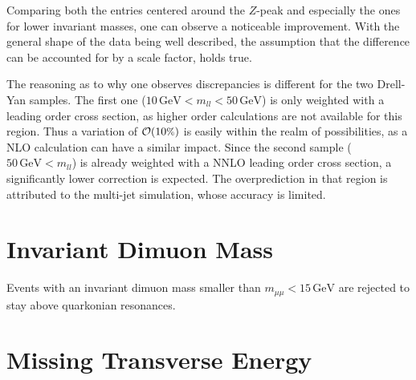 \noindent Comparing both the entries centered around the $Z$-peak and especially the ones for lower invariant masses, one can observe a noticeable improvement. With the general shape of the data being well described, the assumption that the difference can be accounted for by a scale factor, holds true. 

The reasoning as to why one observes discrepancies is different for the two Drell-Yan samples. The first one ($10\,\text{GeV} < m_{ll} < 50\,\text{GeV}$) is only weighted with a leading order cross section, as higher order calculations are not available for this region. Thus a variation of $\mathcal{O}(10\pct)$ is easily within the realm of possibilities, as a NLO calculation can have a similar impact. Since the second sample ($50\,\text{GeV} < m_{ll}$) is already weighted with a NNLO leading order cross section, a significantly lower correction is expected. The overprediction in that region is attributed to the multi-jet simulation, whose accuracy is limited.


\section{Invariant Dimuon Mass}
\label{sec:m_mumu}

Events with an invariant dimuon mass smaller than $m_{\mu\mu} < 15\,\text{GeV}$ are rejected to stay above quarkonian resonances.





\section{Missing Transverse Energy}
\label{sec:met}

